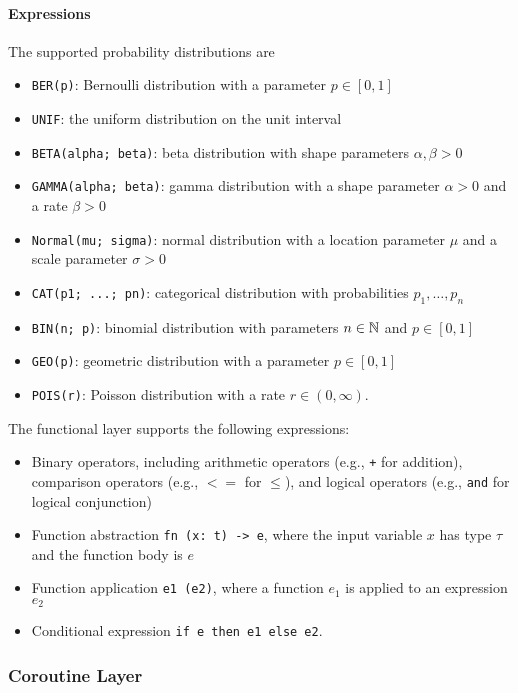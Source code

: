 \paragraph{Expressions}

The supported probability distributions are
\begin{itemize}
  \item \texttt{BER(p)}: Bernoulli distribution with a parameter $p \in [0, 1]$
  \item \texttt{UNIF}: the uniform distribution on the unit interval
  \item \texttt{BETA(alpha; beta)}: beta distribution with shape parameters
        $\alpha, \beta > 0$
  \item \texttt{GAMMA(alpha; beta)}: gamma distribution with a shape parameter
        $\alpha > 0$ and a rate $\beta > 0$
  \item \texttt{Normal(mu; sigma)}: normal distribution with a location
        parameter $\mu$ and a scale parameter $\sigma >0$
  \item \texttt{CAT(p1; ...; pn)}: categorical distribution with probabilities
        $p_1, \ldots, p_n$
  \item \texttt{BIN(n; p)}: binomial distribution with parameters $n \in \mathbb{N}$
        and $p \in [0, 1]$
  \item \texttt{GEO(p)}: geometric distribution with a parameter $p \in [0, 1]$
  \item \texttt{POIS(r)}: Poisson distribution with a rate $r \in (0, \infty)$.
\end{itemize}

The functional layer supports the following expressions:
\begin{itemize}
  \item Binary operators, including arithmetic operators (e.g., \texttt{+} for
        addition), comparison operators (e.g., $<=$ for $\leq$), and logical
        operators (e.g., \texttt{and} for logical conjunction)
  \item Function abstraction \texttt{fn (x: t) -> e}, where the input variable
        $x$ has type $\tau$ and the function body is $e$
  \item Function application \texttt{e1 (e2)}, where a function $e_1$ is applied
        to an expression $e_2$
  \item Conditional expression \texttt{if e then e1 else e2}.
\end{itemize}

\subsubsection{Coroutine Layer}

